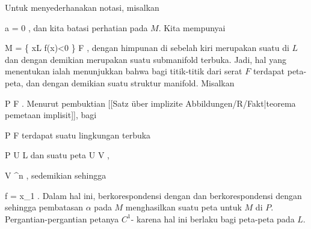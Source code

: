 {

Untuk menyederhanakan notasi, misalkan

\mavergleichskette
{\vergleichskette
{ a
}
{ = }{ 0
}
{  }{
}
{    }{
}
{   }{
}
}
{}{}{,}
dan kita batasi perhatian pada $M$. Kita mempunyai

\mavergleichskettedisp
{\vergleichskette
{ M
}
{ =} { \left\{  x\in L  \mid  f(x)<0        \right\}  \uplus F
}
{ } {
}
{ } {
}
{ } {
}
}
{}{}{,}
dengan himpunan di sebelah kiri merupakan suatu
di $L$ dan dengan demikian merupakan suatu submanifold terbuka. Jadi, hal yang menentukan ialah menunjukkan bahwa bagi titik-titik dari serat $F$ terdapat peta-peta, dan dengan demikian suatu struktur manifold. Misalkan

\mavergleichskette
{\vergleichskette
{ P
}
{ \in }{ F
}
{  }{
}
{    }{
}
{   }{
}
}
{}{}{.}
Menurut pembuktian
[[Satz über implizite Abbildungen/R/Fakt|teorema pemetaan implisit]],
bagi

\mavergleichskette
{\vergleichskette
{ P
}
{ \in }{ F
}
{  }{
}
{    }{
}
{   }{
}
}
{}{}{}
terdapat suatu lingkungan
 {} {}
terbuka

\mavergleichskette
{\vergleichskette
{ P
}
{ \in }{ U
}
{ \subseteq }{ L
}
{    }{
}
{   }{
}
}
{}{}{}
dan suatu peta
\maabbdisp {\alpha} { U } { V
} {,}

\mavergleichskette
{\vergleichskette
{ V
}
{ \subseteq }{ \R^n
}
{  }{
}
{    }{
}
{   }{
}
}
{}{}{,}
sedemikian sehingga

\mavergleichskette
{\vergleichskette
{ f
}
{ = }{ x_1 \circ \alpha
}
{  }{
}
{    }{
}
{   }{
}
}
{}{}{.}
Dalam hal ini,
 berkorespondensi dengan
 dan
 berkorespondensi dengan
 sehingga pembatasan $\alpha$ pada $M$ menghasilkan suatu peta untuk $M$ di $P$. Pergantian-pergantian petanya
$C^1$-
karena hal ini berlaku bagi peta-peta
 {} {}
pada $L$.

}

